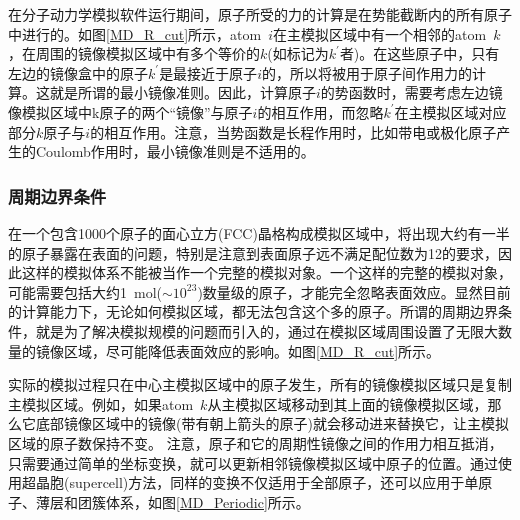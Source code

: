 在分子动力学模拟软件运行期间，原子所受的力的计算是在势能截断内的所有原子中进行的。如图\ref{MD_R_cut}所示，\textrm{atom}~$i$在主模拟区域中有一个相邻的\textrm{atom}~$k$，在周围的镜像模拟区域中有多个等价的$k$(如标记为$k^{\prime}$者)。在这些原子中，只有左边的镜像盒中的原子$k^{\prime}$是最接近于原子$i$的，所以将被用于原子间作用力的计算。这就是所谓的最小镜像准则。因此，计算原子$i$的势函数时，需要考虑左边镜像模拟区域中k原子的两个“镜像”与原子$i$的相互作用，而忽略$k^{\prime}$在主模拟区域对应部分$k$原子与$i$的相互作用。注意，当势函数是长程作用时，比如带电或极化原子产生的\textrm{Coulomb}作用时，最小镜像准则是不适用的。
\subsubsection{周期边界条件}
在一个包含1000个原子的面心立方\textrm{(FCC)}晶格构成模拟区域中，将出现大约有一半的原子暴露在表面的问题，特别是注意到表面原子远不满足配位数为12的要求，因此这样的模拟体系不能被当作一个完整的模拟对象。一个这样的完整的模拟对象，可能需要包括大约1~\textrm{mol}($\sim10^{23}$)数量级的原子，才能完全忽略表面效应。显然目前的计算能力下，无论如何模拟区域，都无法包含这个多的原子。所谓的周期边界条件\cite{PZ13-297_1912}，就是为了解决模拟规模的问题而引入的，通过在模拟区域周围设置了无限大数量的镜像区域，尽可能降低表面效应的影响。如图\ref{MD_R_cut}所示。

实际的模拟过程只在中心主模拟区域中的原子发生，所有的镜像模拟区域只是复制主模拟区域。例如，如果\textrm{atom}~$k$从主模拟区域移动到其上面的镜像模拟区域，那么它底部镜像区域中的镜像(带有朝上箭头的原子)就会移动进来替换它，让主模拟区域的原子数保持不变。
注意，原子和它的周期性镜像之间的作用力相互抵消，只需要通过简单的坐标变换，就可以更新相邻镜像模拟区域中原子的位置。通过使用超晶胞\textrm{(supercell)}方法，同样的变换不仅适用于全部原子，还可以应用于单原子、薄层和团簇体系，如图\ref{MD_Periodic}所示。
